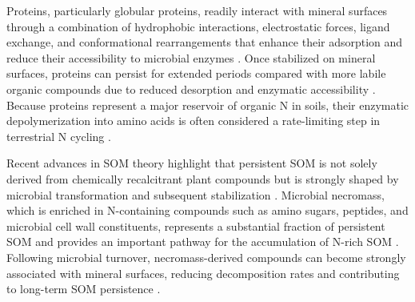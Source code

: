 \documentclass[bg, manuscript]{copernicus}
\begin{document}
Proteins, particularly globular proteins, readily interact with mineral surfaces through a combination of hydrophobic interactions, electrostatic forces, ligand exchange, and conformational rearrangements that enhance their adsorption and reduce their accessibility to microbial enzymes \citep{Haynes1994, Yu2002}. Once stabilized on mineral surfaces, proteins can persist for extended periods compared with more labile organic compounds due to reduced desorption and enzymatic accessibility \citep{Demarchi2016}. Because proteins represent a major reservoir of organic N in soils, their enzymatic depolymerization into amino acids is often considered a rate-limiting step in terrestrial N cycling \citep{Jan2009}.

Recent advances in SOM theory highlight that persistent SOM is not solely derived from chemically recalcitrant plant compounds but is strongly shaped by microbial transformation and subsequent stabilization \citep{Liang2019}. Microbial necromass, which is enriched in N-containing compounds such as amino sugars, peptides, and microbial cell wall constituents, represents a substantial fraction of persistent SOM and provides an important pathway for the accumulation of N-rich SOM \citep{Miltner2012}. Following microbial turnover, necromass-derived compounds can become strongly associated with mineral surfaces, reducing decomposition rates and contributing to long-term SOM persistence \citep{Kallenbach2016}.
\end{document}
